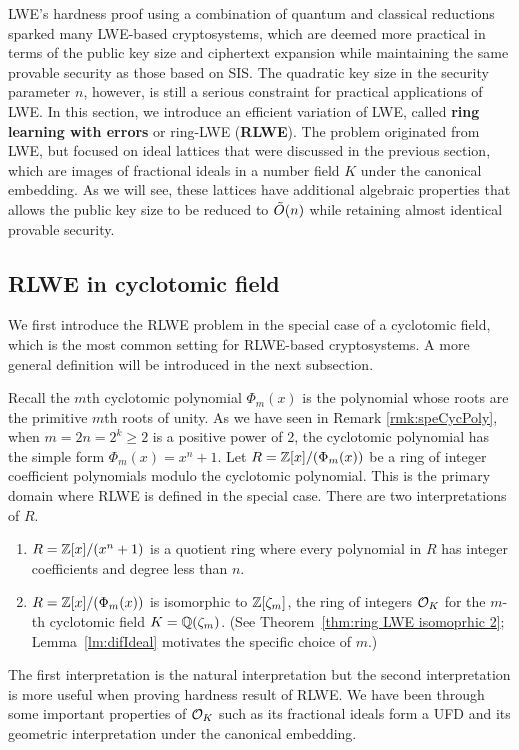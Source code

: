 \documentclass[../main.tex]{subfiles}
\begin{document}
\label{section:rlwe}

LWE's hardness proof using a combination of quantum and classical reductions sparked many LWE-based cryptosystems, which are deemed more practical in terms of the public key size and ciphertext expansion while maintaining the same provable security as those based on SIS. The quadratic key size in the security parameter $n$, however, is still a serious constraint for practical applications of LWE. In this section, we introduce an efficient variation of LWE, called \textbf{ring learning with errors} or ring-LWE (\textbf{RLWE}). The problem originated from LWE, but focused on ideal lattices that were discussed in the previous section, which are images of fractional ideals in a number field $K$ under the canonical embedding. As we will see, these lattices have additional algebraic properties that allows the public key size to be reduced to $\Tilde{O}(n)$ while retaining almost identical provable security.


\subsection{RLWE in cyclotomic field}

We first introduce the RLWE problem in the special case of a cyclotomic field, which is the most common setting for RLWE-based cryptosystems. 
A more general definition will be introduced in the next subsection.  

Recall the $m$th cyclotomic polynomial $\Phi_m(x)$ is the polynomial whose roots are the primitive $m$th roots of unity. As we have seen in Remark \ref{rmk:speCycPoly}, when $m=2n=2^k \ge 2$ is a positive power of 2, the cyclotomic polynomial has the simple form $\Phi_m(x)=x^n+1$. 
Let $R=\mathbb{Z}[x]/(\Phi_m(x))$ be a ring of integer coefficient polynomials modulo the cyclotomic polynomial. This is the primary domain where RLWE is defined in the special case. 
There are two interpretations of $R$. 
\begin{enumerate}\itemsep1mm\parskip0mm
    \item $R = \mathbb{Z}[x]/(x^n+1)$ is a quotient ring where every polynomial in $R$ has integer coefficients and degree less than $n$.
    \item $R = \mathbb{Z}[x]/(\Phi_m(x))$ is isomorphic to $\mathbb{Z}[\zeta_m]$, the ring of integers $\mathcal{O}_K$ for the $m$-th cyclotomic field $K=\mathbb{Q}(\zeta_m)$. (See Theorem~\ref{thm:ring LWE isomoprhic 2}; Lemma~\ref{lm:difIdeal} motivates the specific choice of $m$.)
\end{enumerate} 
 The first interpretation is the natural interpretation but the second interpretation is more useful when proving hardness result of RLWE. We have been through some important properties of $\mathcal{O}_K$ such as its fractional ideals form a UFD and its geometric interpretation under the canonical embedding. 
\end{document}
